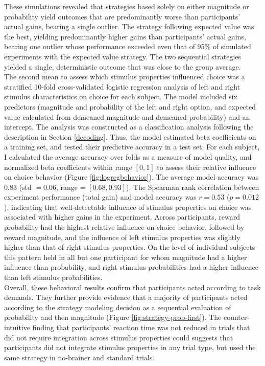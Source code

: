 These simulations revealed that strategies based solely on either magnitude or probability yield outcomes that are predominantly worse than participants' actual gains, bearing a single outlier.
The strategy following expected value was the best, yielding predominantly higher gains than participants' actual gains, bearing one outlier whose performance exceeded even that of 95\% of simulated experiments with the expected value strategy.
The two sequential strategies yielded a single, deterministic outcome that was close to the group average.\\
The second mean to assess which stimulus properties influenced choice was a stratified 10-fold cross-validated logistic regression analysis of left and right stimulus characteristics on choice for each subject.
The model included six predictors (magnitude and probability of the left and right option, and expected value calculated from demeaned magnitude and demeaned probability) and an intercept.
The analysis was constructed as a classification analysis following the description in Section \ref{decoding}.
Thus, the model estimated beta coefficients on a training set, and tested their predictive accuracy in a test set.
For each subject, I calculated the average accuracy over folds as a measure of model quality, and normalized beta coefficients within range $[0, 1]$ to assess their relative influence on choice behavior (Figure \ref{fig:logregbehavior}).
The average model accuracy was $0.83$ (std $=0.06$, range = $[0.68, 0.93]$).
The Spearman rank correlation between experiment performance (total gain) and model accuracy was $r=0.53$ ($p=0.012$), indicating that well-detectable influence of stimulus properties on choice was associated with higher gains in the experiment.
Across participants, reward probability had the highest relative influence on choice behavior, followed by reward magnitude, and the influence of left stimulus properties was slightly higher than that of right stimulus properties.
On the level of individual subjects this pattern held in all but one participant for whom magnitude had a higher influence than probability, and right stimulus probabilities had a higher influence than left stimulus probabilities.\\
Overall, these behavioral results confirm that participants acted according to task demands.
They further provide evidence that a majority of participants acted according to the strategy modeling decision as a sequential evaluation of probability and then magnitude (Figure \ref{fig:strategy-prob-first}).
The counter-intuitive finding that participants' reaction time was not reduced in trials that did not require integration across stimulus properties could suggests that participants did not integrate stimulus properties in any trial type, but used the same strategy in no-brainer and standard trials.


